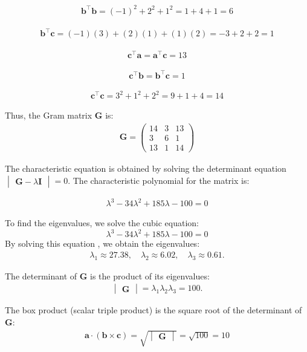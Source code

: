 \documentclass{beamer}
\numberwithin{equation}{section}
\theoremstyle{remark}
\newcommand{\myvec}[1]{\ensuremath{\begin{pmatrix}#1\end{pmatrix}}}
\newcommand{\mydet}[1]{\ensuremath{\begin{vmatrix}#1\end{vmatrix}}}
\let\vec\mathbf
\begin{document}
\begin{frame}

\begin{align}
\vec{b}^\top \vec{b} = (-1)^2 + 2^2 + 1^2 = 1 + 4 + 1 = 6
\end{align}

\begin{align}
\vec{b}^\top \vec{c} = (-1)(3) + (2)(1) + (1)(2) = -3 + 2 + 2 = 1
\end{align}

\begin{align}
\vec{c}^\top \vec{a} = \vec{a}^\top \vec{c} = 13
\end{align}

\begin{align}
\vec{c}^\top \vec{b} = \vec{b}^\top \vec{c} = 1
\end{align}

\begin{align}
\vec{c}^\top \vec{c} = 3^2 + 1^2 + 2^2 = 9 + 1 + 4 = 14
\end{align}

Thus, the Gram matrix \( \vec{G} \) is:
\begin{align}
\vec{G} = \myvec{
14 & 3 & 13 \\
3 & 6 & 1 \\
13 & 1 & 14
}
\end{align}

\end{frame}

\begin{frame}

The characteristic equation is obtained by solving the determinant equation \( \mydet{\vec{G} - \lambda \vec{I}} = 0 \). The characteristic polynomial for the matrix is:

\begin{align}
\lambda^3 - 34\lambda^2 + 185\lambda - 100 = 0
\end{align}


To find the eigenvalues, we solve the cubic equation:
\[
\lambda^3 - 34\lambda^2 + 185\lambda - 100 = 0
\]
By solving this equation , we obtain the eigenvalues:
\begin{align}
\lambda_1 \approx 27.38, \quad \lambda_2 \approx 6.02, \quad \lambda_3 \approx 0.61.
\end{align}


The determinant of \( \vec{G} \) is the product of its eigenvalues:
\begin{align}
\mydet{\vec{G}} = \lambda_1 \lambda_2 \lambda_3 = 100.
\end{align}


The box product (scalar triple product) is the square root of the determinant of \( \vec{G} \):
\begin{align}
\vec{a} \cdot (\vec{b} \times \vec{c}) = \sqrt{\mydet{\vec{G}}} = \sqrt{100} = 10
\end{align}

\end{frame}
\end{document}
